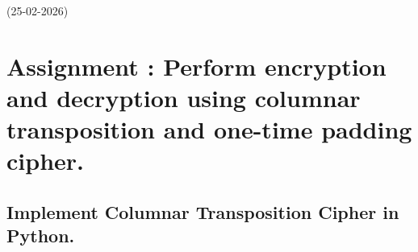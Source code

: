 
{(25-02-2026)}{\thepage}
\section*{\centering Assignment \thesection: Perform encryption and decryption using columnar transposition and one-time padding cipher.}

\subsection{Implement Columnar Transposition Cipher in Python.}
